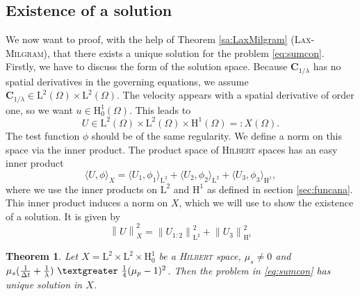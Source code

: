 \documentclass[12pt,a4paper,twoside, open=right]{scrreprt}
\theoremstyle{definition}
\theoremstyle{plain}
\newtheorem{sa}[auf]{Theorem}
\newcommand{\g}{~\textgreater ~}
\newcommand{\norm}[1]{\left\lVert#1\right\rVert}
\newcommand{\bfC}{\bm{C}}
\begin{document}
\subsection{Existence of a solution}
\label{sec:existence}
We now want to proof, with the help of Theorem \ref{sa:LaxMilgram} (\textsc{Lax-Milgram}), that there exists a unique solution for the problem \eqref{eq:sumcon}. Firstly, we have to discuss the form of the solution space. Because $\bfC_{1/\lambda}$ has no spatial derivatives in the governing equations, we assume $\bfC_{1/\lambda}\in \mathrm{L}^2(\Omega)\times \mathrm{L}^2(\Omega)$. The velocity appears with a spatial derivative of order one, so we want $u\in \mathrm{H}^1_0(\Omega)$. This leads to 
\begin{equation}
    U\in \mathrm{L}^2(\Omega)\times \mathrm{L}^2(\Omega)\times \mathrm{H}^1(\Omega)=:X(\Omega).
\end{equation} The test function $\phi$ should be of the same regularity. We define a norm on this space via the inner product. The product space of \textsc{Hilbert} spaces has an easy inner product
\begin{equation}
    \langle U,\phi\rangle_X = \langle U_1,\phi_1\rangle_{\mathrm{L}^2} +  \langle U_2,\phi_2\rangle_{\mathrm{L}^2} +\langle U_3,\phi_3\rangle_{\mathrm{H}^1},
\end{equation}
where we use the inner products on $\mathrm{L}^2$ and $\mathrm{H}^1$ as defined in section \ref{sec:funcana}. This inner product induces a norm on $X$, which we will use to show the existence of a solution. It is given by
\begin{equation}
    \norm{U}_X^2=\norm{U_{1:2}}_{\mathrm{L}^2}^2+\norm{U_3}_{\mathrm{H}^1}^2
\end{equation}
\begin{sa}
    Let $X=\mathrm{L}^2\times\mathrm{L}^2\times \mathrm{H}^1_0$ be a \textsc{Hilbert} space, $\mu_s\neq 0$ and $\mu_s(\frac{1}{\Delta t}+\frac{1}{\lambda})\g \frac{1}{4}(\mu_p-1)^2$.
    Then the problem in \eqref{eq:sumcon} has unique solution  in $X$.
\end{sa}
\end{document}
